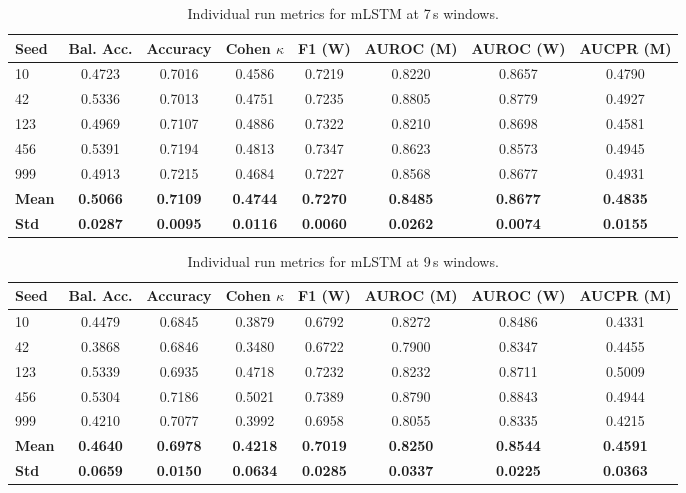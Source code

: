 \begin{table}[htbp]
\centering
\caption{Individual run metrics for mLSTM at 7\,s windows.}
\label{tab:app_metrics_mlstm_7s}
\footnotesize
\setlength{\tabcolsep}{2.5pt}
\begin{tabular}{l | c | c | c | c | c | c | c}
\textbf{Seed} & \textbf{Bal. Acc.} & \textbf{Accuracy} & \textbf{Cohen \(\kappa\)} & \textbf{F1 (W)} & \textbf{AUROC (M)} & \textbf{AUROC (W)} & \textbf{AUCPR (M)} \\
\hline
10  & 0.4723 & 0.7016 & 0.4586 & 0.7219 & 0.8220 & 0.8657 & 0.4790 \\
42  & 0.5336 & 0.7013 & 0.4751 & 0.7235 & 0.8805 & 0.8779 & 0.4927 \\
123 & 0.4969 & 0.7107 & 0.4886 & 0.7322 & 0.8210 & 0.8698 & 0.4581 \\
456 & 0.5391 & 0.7194 & 0.4813 & 0.7347 & 0.8623 & 0.8573 & 0.4945 \\
999 & 0.4913 & 0.7215 & 0.4684 & 0.7227 & 0.8568 & 0.8677 & 0.4931 \\
\hline
\textbf{Mean} & \textbf{0.5066} & \textbf{0.7109} & \textbf{0.4744} & \textbf{0.7270} & \textbf{0.8485} & \textbf{0.8677} & \textbf{0.4835} \\
\textbf{Std} & \textbf{0.0287} & \textbf{0.0095} & \textbf{0.0116} & \textbf{0.0060} & \textbf{0.0262} & \textbf{0.0074} & \textbf{0.0155} \\
\hline
\end{tabular}
\setlength{\tabcolsep}{6pt}
\end{table}

\begin{table}[htbp]
\centering
\caption{Individual run metrics for mLSTM at 9\,s windows.}
\label{tab:app_metrics_mlstm_9s}
\footnotesize
\setlength{\tabcolsep}{2.5pt}
\begin{tabular}{l | c | c | c | c | c | c | c}
\textbf{Seed} & \textbf{Bal. Acc.} & \textbf{Accuracy} & \textbf{Cohen \(\kappa\)} & \textbf{F1 (W)} & \textbf{AUROC (M)} & \textbf{AUROC (W)} & \textbf{AUCPR (M)} \\
\hline
10  & 0.4479 & 0.6845 & 0.3879 & 0.6792 & 0.8272 & 0.8486 & 0.4331 \\
42  & 0.3868 & 0.6846 & 0.3480 & 0.6722 & 0.7900 & 0.8347 & 0.4455 \\
123 & 0.5339 & 0.6935 & 0.4718 & 0.7232 & 0.8232 & 0.8711 & 0.5009 \\
456 & 0.5304 & 0.7186 & 0.5021 & 0.7389 & 0.8790 & 0.8843 & 0.4944 \\
999 & 0.4210 & 0.7077 & 0.3992 & 0.6958 & 0.8055 & 0.8335 & 0.4215 \\
\hline
\textbf{Mean} & \textbf{0.4640} & \textbf{0.6978} & \textbf{0.4218} & \textbf{0.7019} & \textbf{0.8250} & \textbf{0.8544} & \textbf{0.4591} \\
\textbf{Std} & \textbf{0.0659} & \textbf{0.0150} & \textbf{0.0634} & \textbf{0.0285} & \textbf{0.0337} & \textbf{0.0225} & \textbf{0.0363} \\
\hline
\end{tabular}
\setlength{\tabcolsep}{6pt}
\end{table}

